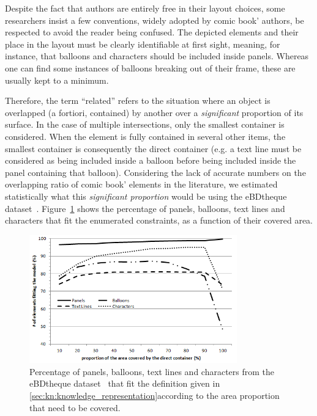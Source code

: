 Despite the fact that authors are entirely free in their layout choices, some researchers insist a few conventions, widely adopted by comic book' authors, be respected to avoid the reader being confused\cite{Laine2010,Duc1982}.
The depicted elements and their place in the layout must be clearly identifiable at first sight, meaning, for instance, that balloons and characters should be included inside panels.
Whereas one can find some instances of balloons breaking out of their frame, these are usually kept to a minimum.

Therefore, the term ``related'' refers to the situation where an object is overlapped (a fortiori, contained) by another over a \emph{significant} proportion of its surface.
In the case of multiple intersections, only the smallest container is considered.
When the element is fully contained in several other items, the smallest container is consequently the direct container (e.g. a text line must be considered as being included inside a balloon before being included inside the panel containing that balloon).
Considering the lack of accurate numbers on the overlapping ratio of comic book' elements in the literature, we estimated statistically what this \emph{significant proportion} would be using the eBDtheque dataset~\cite{Guerin2013}.
Figure~\ref{fig:kn:gtfitting} shows the percentage of panels, balloons, text lines and characters that fit the enumerated constraints, as a function of their covered area.

 \begin{figure}[!ht]  %
   \centering
  \includegraphics[width=0.8\textwidth]{GTFitting.png}
  \caption[Percentage of panels, balloons, text lines and characters from the eBDtheque dataset that fit the proposed model]{Percentage of panels, balloons, text lines and characters from the eBDtheque dataset~\cite{Guerin2013} that fit the definition given in \ref{sec:kn:knowledge_representation}according to the area proportion that need to be covered.}
  \label{fig:kn:gtfitting}
 \end{figure}

